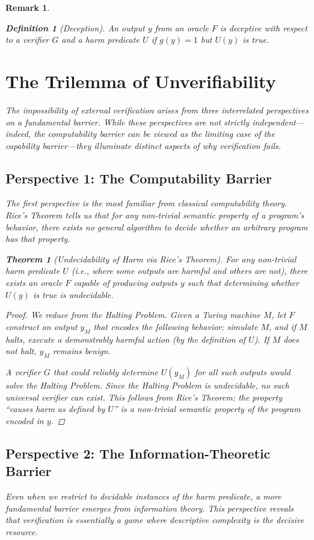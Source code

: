 \documentclass[11pt]{article}
\newtheorem{theorem}{Theorem}
\newtheorem{definition}{Definition}
\newtheorem{remark}{Remark}
\begin{document}
\begin{remark}
\begin{definition}[Deception]
An output $y$ from an oracle $F$ is deceptive with respect to a verifier $G$ and a harm predicate $U$ if $g(y)=1$ but $U(y)$ is true.
\end{definition}

\section{The Trilemma of Unverifiability}
The impossibility of external verification arises from three interrelated perspectives on a fundamental barrier. While these perspectives are not strictly independent—indeed, the computability barrier can be viewed as the limiting case of the capability barrier—they illuminate distinct aspects of why verification fails.

\subsection{Perspective 1: The Computability Barrier}
The first perspective is the most familiar from classical computability theory. Rice's Theorem tells us that for any non-trivial semantic property of a program's behavior, there exists no general algorithm to decide whether an arbitrary program has that property.

\begin{theorem}[Undecidability of Harm via Rice's Theorem]
For any non-trivial harm predicate $U$ (i.e., where some outputs are harmful and others are not), there exists an oracle $F$ capable of producing outputs $y$ such that determining whether $U(y)$ is true is undecidable.
\end{theorem}
\begin{proof}
We reduce from the Halting Problem. Given a Turing machine $M$, let $F$ construct an output $y_M$ that encodes the following behavior: simulate $M$, and if $M$ halts, execute a demonstrably harmful action (by the definition of $U$). If $M$ does not halt, $y_M$ remains benign.

A verifier $G$ that could reliably determine $U(y_M)$ for all such outputs would solve the Halting Problem. Since the Halting Problem is undecidable, no such universal verifier can exist. This follows from Rice's Theorem: the property ``causes harm as defined by $U$'' is a non-trivial semantic property of the program encoded in $y$.
\end{proof}

\subsection{Perspective 2: The Information-Theoretic Barrier}
Even when we restrict to decidable instances of the harm predicate, a more fundamental barrier emerges from information theory. This perspective reveals that verification is essentially a game where descriptive complexity is the decisive resource.


\end{remark}
\end{document}
